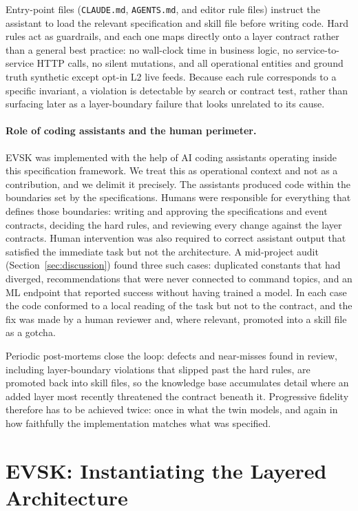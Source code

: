 \documentclass[runningheads]{llncs}
\begin{document}
Entry-point files (\texttt{CLAUDE.md}, \texttt{AGENTS.md}, and editor rule files) instruct the assistant to load the relevant specification and skill file before writing code. Hard rules act as guardrails, and each one maps directly onto a layer contract rather than a general best practice: no wall-clock time in business logic, no service-to-service HTTP calls, no silent mutations, and all operational entities and ground truth synthetic except opt-in L2 live feeds. Because each rule corresponds to a specific invariant, a violation is detectable by search or contract test, rather than surfacing later as a layer-boundary failure that looks unrelated to its cause.

\paragraph{Role of coding assistants and the human perimeter.}
EVSK was implemented with the help of AI coding assistants operating inside this specification framework. We treat this as operational context and not as a contribution, and we delimit it precisely. The assistants produced code within the boundaries set by the specifications. Humans were responsible for everything that defines those boundaries: writing and approving the specifications and event contracts, deciding the hard rules, and reviewing every change against the layer contracts. Human intervention was also required to correct assistant output that satisfied the immediate task but not the architecture. A mid-project audit (Section~\ref{sec:discussion}) found three such cases: duplicated constants that had diverged, recommendations that were never connected to command topics, and an ML endpoint that reported success without having trained a model. In each case the code conformed to a local reading of the task but not to the contract, and the fix was made by a human reviewer and, where relevant, promoted into a skill file as a gotcha.

Periodic post-mortems close the loop: defects and near-misses found in review, including layer-boundary violations that slipped past the hard rules, are promoted back into skill files, so the knowledge base accumulates detail where an added layer most recently threatened the contract beneath it. Progressive fidelity therefore has to be achieved twice: once in what the twin models, and again in how faithfully the implementation matches what was specified.

\section{EVSK: Instantiating the Layered Architecture}\label{sec:implementation}
\end{document}
